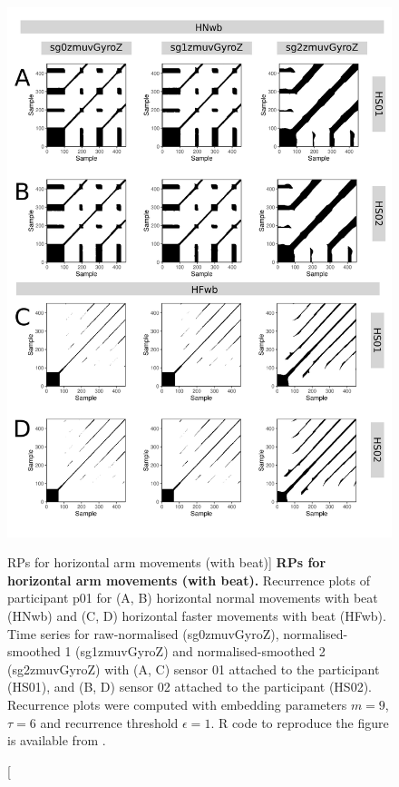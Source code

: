 \begin{figure}
\centering
\includegraphics[height=0.8\textheight]{rps_Hwb_w500}
\caption
	[RPs for horizontal arm movements (with beat)]{
	{\bf RPs for horizontal arm movements (with beat).}	
	Recurrence plots of participant p01 for 
	(A, B) horizontal normal movements with beat (HNwb) and
	(C, D) horizontal faster movements with beat (HFwb).
	Time series for raw-normalised (sg0zmuvGyroZ), 
	normalised-smoothed 1 (sg1zmuvGyroZ) and 
	normalised-smoothed 2 (sg2zmuvGyroZ) with
	(A, C) sensor 01 attached to the participant (HS01), and
	(B, D) sensor 02 attached to the participant (HS02).
	Recurrence plots were computed with 
	embedding parameters $m=9$, $\tau=6$ and 
	recurrence threshold $\epsilon=1$.
	R code to reproduce the figure is available from \cite{hwum2018}.
        }
    \label{fig:rps_Hwb_w500}
\end{figure}
